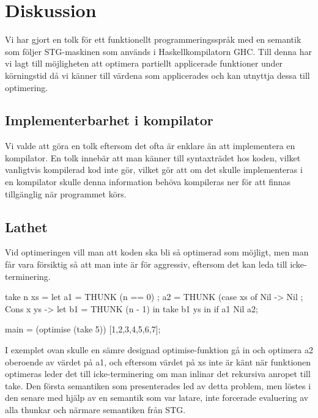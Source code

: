 \documentclass[Rapport]{subfiles}
\begin{document}
\section{Diskussion}


    
Vi har gjort en tolk för ett funktionellt programmeringsspråk
med en semantik som följer STG-maskinen som används i Haskellkompilatorn GHC.
Till denna har vi lagt till möjligheten att optimera partiellt applicerade funktioner under körningstid
då vi känner till värdena som applicerades och kan utnyttja dessa till optimering.

\subsection{Implementerbarhet i kompilator}
Vi valde att göra en tolk eftersom det ofta är enklare än att implementera en kompilator.
En tolk innebär att man känner till syntaxträdet hos koden, vilket vanligtvis kompilerad
kod inte gör, vilket gör att om det skulle implementeras i en kompilator skulle
denna information behöva kompileras ner för att finnas tillgänglig när programmet körs.


\subsection{Lathet}
Vid optimeringen vill man att koden ska bli så optimerad som möjligt, men man får
vara försiktig så att man inte är för aggressiv, 
eftersom det kan leda till icke-terminering.

\begin{codeEx}
take n xs = let
    { a1 = THUNK (n == 0)
    ; a2 = THUNK (case xs of
        { Nil -> Nil
        ; Cons x ys -> let
            { b1 = THUNK (n - 1)
            } in take b1 ys
        }
    } in if a1 Nil a2;

main = (optimise (take 5)) [1,2,3,4,5,6,7];
\end{codeEx}

I exemplet ovan skulle en sämre designad optimise-funktion gå in och optimera a2 oberoende av värdet på
a1, och eftersom värdet på xs inte är känt när funktionen optimeras leder det till
icke-terminering om man inlinar det rekursiva anropet till take.
    Den första semantiken som presenterades led av detta problem, men löstes i den senare med hjälp av
en semantik som var latare, inte forcerade evaluering av alla thunkar och närmare semantiken från STG.
\end{document}

